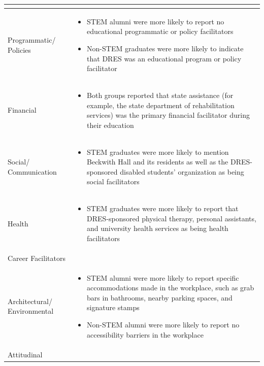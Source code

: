 \documentclass[11.5pt]{sig-alternate} %
\begin{document}
\begin{large}
\begin{table}[thp]
\begin{tabular}{|l|l|}
\begin{itemize}[noitemsep, topsep=0pt, leftmargin=*]
\end{itemize} \\ \hline
Programmatic/ Policies &
\begin{itemize}[noitemsep, topsep=0pt, leftmargin=*]
\item STEM alumni were more likely to report no educational programmatic or policy facilitators
\item Non-STEM graduates were more likely to indicate that DRES was an educational program or policy facilitator  
\end{itemize} \\ \hline
Financial &
\begin{itemize}[noitemsep, topsep=0pt, leftmargin=*]
\item Both groups reported that state assistance (for example, the state department of rehabilitation services) was the primary financial facilitator during their education
\end{itemize} \\ \hline
Social/ Communication &
\begin{itemize}[noitemsep, topsep=0pt, leftmargin=*]
\item STEM graduates were more likely to mention Beckwith Hall and its residents as well as the DRES-sponsored disabled students' organization as being social facilitators
\end{itemize} \\ \hline
Health &
\begin{itemize}[noitemsep, topsep=0pt, leftmargin=*]
\item STEM graduates were more likely to report that DRES-sponsored physical therapy, personal assistants, and university health services as being health facilitators
\end{itemize} \\ \hline
%
Career Facilitators & \\ \hline
Architectural/ Environmental & 
\begin{itemize}[noitemsep, topsep=0pt, leftmargin=*]
\item STEM alumni were more likely to report specific accommodations made in the workplace, such as grab bars in bathrooms, nearby parking spaces, and signature stamps
\item Non-STEM alumni were more likely to report no accessibility barriers in the workplace
\end{itemize} \\ \hline
Attitudinal &
\begin{itemize}[noitemsep, topsep=0pt, leftmargin=*]

\end{itemize}
\end{tabular}
\end{table}
\end{large}
\end{document}
